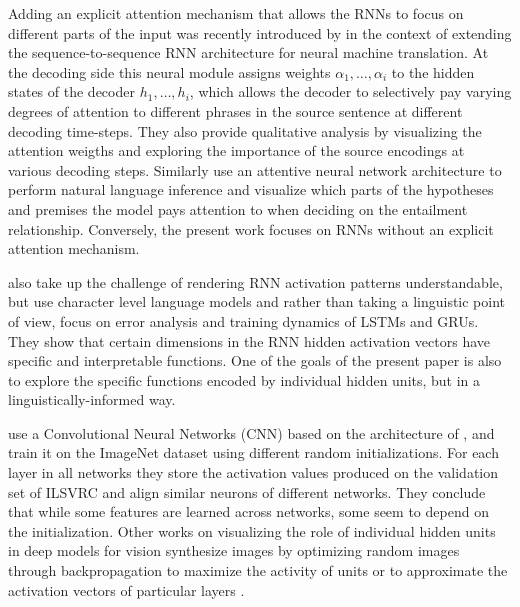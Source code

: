 Adding an explicit attention mechanism that allows the RNNs to focus on \label{edit:attention}
different parts of the input was recently introduced by 
in the context of extending the sequence-to-sequence 
RNN architecture for neural machine translation. 
At the decoding side this neural module assigns weights 
$\alpha_{1},\ldots,\alpha_{i}$ to the hidden states of the decoder 
$h_{1},\ldots,h_{i}$, which allows the decoder to selectively pay varying degrees of
attention to different phrases in the source sentence at different decoding time-steps.
They also provide qualitative analysis by visualizing the attention
weigths and exploring the importance of the source encodings at various decoding steps.
Similarly  use an attentive neural 
network architecture to perform natural language inference and visualize which parts
of the hypotheses and premises the model pays attention to when deciding on the 
entailment relationship. Conversely, the present work focuses on RNNs without an 
explicit attention mechanism.

 also take up the challenge of
rendering RNN activation patterns understandable, but use character
level language models and rather than taking a linguistic point of
view, focus on error analysis and training dynamics of LSTMs and
GRUs.  They show that certain dimensions in the RNN hidden activation
vectors have specific and interpretable functions. One of the goals of
the present paper is also to explore the specific functions encoded
by individual hidden units, but in a linguistically-informed way.

 use a Convolutional Neural Networks (CNN)
based on the architecture of , 
and train it on the ImageNet dataset using different random initializations. For each layer
in all networks they store the activation values produced on the
validation set of ILSVRC and align similar neurons of different
networks. They conclude that while some features are learned across
networks, some seem to depend on the initialization. Other works on
visualizing the role of individual hidden units in deep models for vision
synthesize images by optimizing random images through backpropagation
to maximize the activity of units
\cite{erhan2009visualizing,simonyan2013deep,yosinski2015understanding,nguyen2016multifaceted}
or to approximate the activation vectors of particular layers
\cite{mahendran2015visualizing,dosovitskiy2015inverting}.

